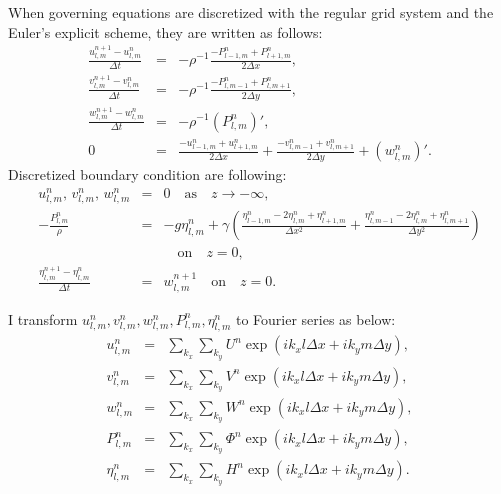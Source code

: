 \documentclass[a4paper,11pt]{article}
\newcommand{\as}{\quad\mathrm{as}\quad}
\newcommand{\on}{\quad\mathrm{on}\quad}
\begin{document}
When governing equations are discretized with the regular grid system and the Euler’s explicit scheme, they are written as follows:
\begin{eqnarray}
\frac{u^{n+1}_{l,m} - u^{n}_{l,m}}{\Delta t}
 &=& - \rho^{-1}\frac{- P^{n}_{l-1,m} + P^{n}_{l+1,m}}{2\Delta x}, \\
\frac{v^{n+1}_{l,m} - v^{n}_{l,m}}{\Delta t}
 &=& - \rho^{-1}\frac{- P^{n}_{l,m-1} + P^{n}_{l,m+1}}{2\Delta y}, \\
\frac{w^{n+1}_{l,m}-w^{n}_{l,m}}{\Delta t} &=& -
 \rho^{-1}(P^{n}_{l,m})', \\
0 &=&  \frac{-u^{n}_{l-1,m}+u^{n}_{l+1,m}}{2\Delta x}
+ \frac{-v^{n}_{l,m-1}+v^{n}_{l,m+1}}{2\Delta y}
+ (w^n_{l,m})'.
\end{eqnarray}
Discretized boundary condition are following:
\begin{eqnarray}
 u^n_{l,m},\,v^n_{l,m},\,w^n_{l,m} &=& 0 \as z \to -\infty, \\
- \frac{P^n_{l,m}}{\rho}
&=& - g\eta^n_{l,m}
+ \gamma \left(
  \frac{\eta^n_{l-1,m} - 2\eta^n_{l,m} + \eta^n_{l+1,m}}{\Delta x^2}
+ \frac{\eta^n_{l,m-1} - 2\eta^n_{l,m} + \eta^n_{l,m+1}}{\Delta y^2}
  \right) \nonumber \\&&\on z=0, \\
 \frac{\eta^{n+1}_{l,m} - \eta^{n}_{l,m}}{\Delta t}
&=& w^{n+1}_{l,m}
 \on z=0. \label{kbc_discritize}
\end{eqnarray}

I transform $u^n_{l,m}, v^n_{l,m}, w^n_{l,m}, P^n_{l,m}, \eta^n_{l,m}$ to Fourier series as below:
\begin{eqnarray}
u^n_{l,m} &=& \sum_{k_x}\sum_{k_y} U^n\exp(ik_x
 l\Delta x + ik_y m\Delta y), \\
v^n_{l,m} &=& \sum_{k_x}\sum_{k_y} V^n\exp(ik_x
l\Delta x + ik_y m\Delta y), \\
w^n_{l,m} &=& \sum_{k_x}\sum_{k_y} W^n\exp(ik_x
 l\Delta x + ik_y m\Delta y), \\
P^n_{l,m} &=& \sum_{k_x}\sum_{k_y} \Phi^n\exp(ik_x l\Delta x +
 ik_y m\Delta y), \\
\eta^n_{l,m} &=& \sum_{k_x}\sum_{k_y} H^n\exp(ik_x l\Delta x + ik_y m\Delta y).
\end{eqnarray}
\end{document}
